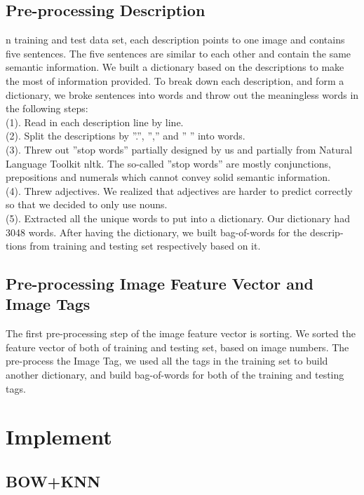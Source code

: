 \documentclass{article}
\begin{document}
\subsection{Pre-processing Description }
n training and test data set, each description points to one image and contains five sentences. The five sentences are similar to each other and contain the same semantic information. We built a dictionary based on the descriptions to make the most of information provided. 
To break down each description, and form a dictionary, we broke sentences into words and throw out the meaningless words in the following steps: \\
(1). Read in each description line by line. \\
(2). Split the descriptions by ”.”, ”,” and ” ” into words. \\
(3). Threw out ”stop words” partially designed by us and partially from Natural Language Toolkit nltk. The so-called ”stop words” are mostly conjunctions, prepositions and numerals which cannot convey solid semantic information.\\
(4). Threw adjectives. We realized that adjectives are harder to predict correctly so that we decided to only use nouns.\\
(5). Extracted all the unique words to put into a dictionary. 
Our dictionary had 3048 words. After having the dictionary, we built bag-of-words for the descrip- tions from training and testing set respectively based on it. 
\subsection{Pre-processing Image Feature Vector and Image Tags }

The first pre-processing step of the image feature vector is sorting. We sorted the feature vector of both of training and testing set, based on image numbers. The pre-process the Image Tag, we used all the tags in the training set to build another dictionary, and build bag-of-words for both of the training and testing tags.



\section{Implement}
\label{headings}

\subsection{BOW+KNN}
\end{document}
